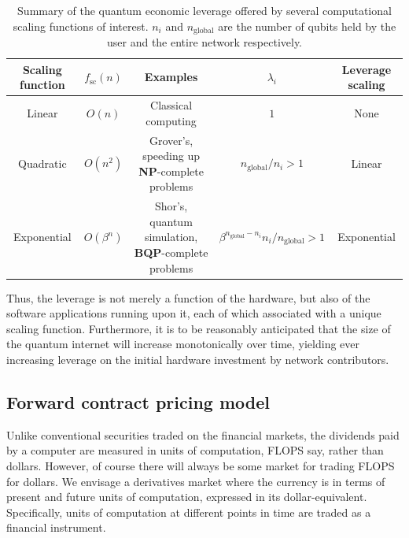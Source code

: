 \documentclass[aps, rmp, twocolumn, amsmath, amssymb, nofootinbib, superscriptaddress, longbibliography, floatfix, table-of-contents, eqsecnum]{revtex4-1}
\newcommand{\comment}[1]{{\color{blue}{\textbf{#1}}}}
\renewcommand{\tablename}{ALG.}
\begin{document}
\begin{table}[!htb]
	\begin{tabular}{|c|c|c|c|c|}
		\hline
  		Scaling function & $f_\text{sc}(n)$ & Examples & $\lambda_i$ & Leverage scaling \\
  		\hline
  		\hline
  		Linear & \mbox{$O(n)$} & Classical computing & \mbox{$1$} & None \\
  		Quadratic & \mbox{$O(n^2)$} & Grover's, speeding up \textbf{NP}-complete problems & \mbox{$n_\text{global}/n_i > 1$} & Linear \\
  		Exponential & \mbox{$O(\beta^n)$} & Shor's, quantum simulation, \textbf{BQP}-complete problems & \mbox{$\beta^{n_\text{global}-n_i} n_i/n_\text{global} > 1$} & Exponential \\
    	\hline
	\end{tabular}
	\caption{Summary of the quantum economic leverage offered by several computational scaling functions of interest. $n_i$ and $n_\text{global}$ are the number of qubits held by the user and the entire network respectively. \comment{Check these}} \label{tab:leverage_summary} 
\end{table}

\renewcommand{\tablename}{ALG.}

Thus, the leverage is not merely a function of the hardware, but also of the software applications running upon it, each of which associated with a unique scaling function. Furthermore, it is to be reasonably anticipated that the size of the quantum internet will increase monotonically over time, yielding ever increasing leverage on the initial hardware investment by network contributors.

%
%

\subsection{Forward contract pricing model}

Unlike conventional securities traded on the financial markets, the dividends paid by a computer are measured in units of computation, FLOPS say, rather than dollars. However, of course there will always be some market for trading FLOPS for dollars. We envisage a derivatives market where the currency is in terms of present and future units of computation, expressed in its dollar-equivalent. Specifically, units of computation at different points in time are traded as a financial instrument.
\end{document}
